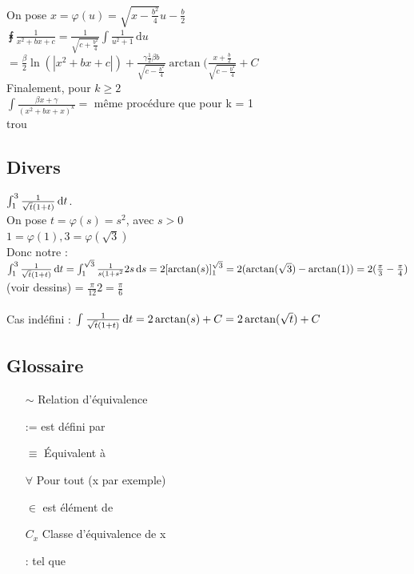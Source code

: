 \documentclass[12pt,a4paper]{article}
\begin{document}
{\begin{enumerate}
\begin{itemize}
		On pose $x = \varphi(u) = \sqrt{x-\frac{b^2}{4}}u - \frac{b}{2}$\\
		$\intx{}{}{\frac{1}{x^2+bx+c}} = \frac{1}{\sqrt{c+\frac{b^2}{4}}}\int{\frac{1}{u^2+1}} \, \mathrm du$\\
		$= \frac{\beta}{2}\ln(|x^2+bx+c|) + \frac{\gamma\frac{1}{2}\beta b}{\sqrt{c-\frac{b^2}{4}}} \arctan (\frac{x+\frac{b}{2}}{\sqrt{c-\frac{b^2}{4}}} + C$\\
		Finalement, pour $k \geq 2$\\
		$\int\frac{\beta x + \gamma}{(x^2+bx+x)^k} = $ même procédure que pour k = 1	\\
		{trou}
	\end{itemize}
\end{enumerate}
\subsection{Divers}
$\int_{1}^{3} \frac{1}{\sqrt{t}(1+t)} \, \mathrm d t$. \\
On pose $t = \varphi(s) = s^2$, avec $ s > 0$\\
$1 = \varphi(1), 3 = \varphi(\sqrt{3})$\\
Donc notre :$\int_{1}^{3} \frac{1}{\sqrt{t}(1+t)} \, \mathrm d t = \int_1^{\sqrt{3}} \frac{1}{s(1+s^2} 2s \, \mathrm ds =  2[\arctan(s)]_1^{\sqrt{3}} = 2(\arctan(\sqrt{3}) - \arctan(1)) = 2(\frac{\pi}{3}-\frac{\pi}{4})$ (voir dessins) = $\frac{\pi}{12}2= \frac{\pi}{6}$\\
\\
Cas indéfini : $\int_{}^{} \frac{1}{\sqrt{t}(1+t)} \, \mathrm d t = 2 \arctan(s) + C = 2\arctan(\sqrt{t}) + C$








\subsection{Glossaire} 
\begin{itemize}
\item[$\sim$] Relation d'équivalence
\item[:=] est défini par
\item[$\equiv$] Équivalent à
\item[$\forall$] Pour tout (x par exemple)
\item[$\in$] est élément de
\item[$C_x$] Classe d'équivalence de x
\item[:] tel que
\end{itemize}

}
\end{document}
